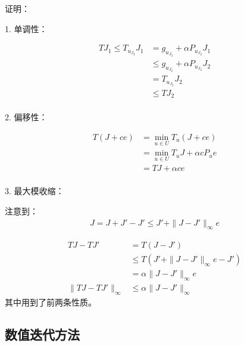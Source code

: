 证明：

1. 单调性：

\begin{equation}
    \begin{aligned}
        TJ_1\leq T_{u_{J_2}}J_1 & = g_{u_{J_2}}+\alpha P_{u_{J_2}}J_1    \\
                                & \leq g_{u_{J_2}}+\alpha P_{u_{J_2}}J_2 \\
                                & = T_{u_{J_2}}J_2                       \\
                                & \leq TJ_2                              \\
    \end{aligned}
\end{equation}

2. 偏移性：

\begin{equation}
    \begin{aligned}
        T(J+ce) & = \min_{u\in U}T_u(J+ce)          \\
                & = \min_{u\in U}T_uJ+\alpha cP_u e \\
                & = TJ+\alpha ce                    \\
    \end{aligned}
\end{equation}

3. 最大模收缩：


注意到：
\begin{equation}
    \begin{aligned}
        J = J + J' - J' \leq J' + \|J-J'\|_{\infty}e
    \end{aligned}
\end{equation}


\begin{equation}
    \begin{aligned}
        TJ - TJ'            & = T(J-J')                            \\
                            & \leq T(J' + \|J-J'\|_{\infty}e - J') \\
                            & = \alpha \|J-J'\|_{\infty}e          \\
        \|TJ-TJ'\|_{\infty} & \leq \alpha \|J-J'\|_{\infty}
    \end{aligned}
\end{equation}
其中用到了前两条性质。

\subsection{数值迭代方法}

